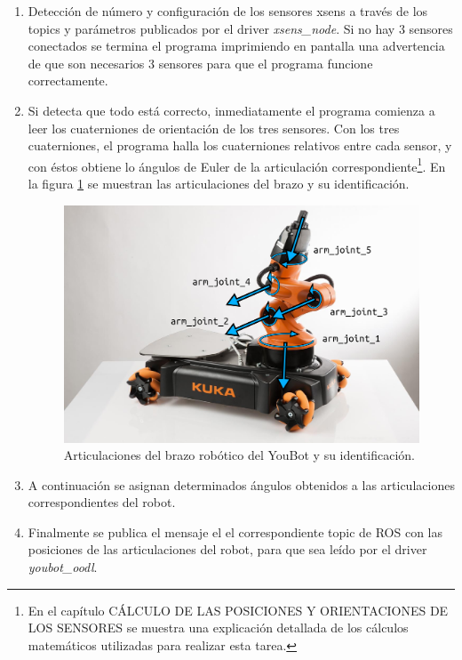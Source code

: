 \documentclass[12pt, a4paper]{report}
\begin{document}
\begin{enumerate}

\item Detección de número y configuración de los sensores xsens a través de los topics y parámetros publicados por el driver \textit{xsens\_node}. Si no hay 3 sensores conectados se termina el programa imprimiendo en pantalla una advertencia de que son necesarios 3 sensores para que el programa funcione correctamente.

\item Si detecta que todo está correcto, inmediatamente el programa comienza a leer los cuaterniones de orientación de los tres sensores. Con los tres cuaterniones, el programa halla los cuaterniones relativos entre cada sensor, y con éstos obtiene lo ángulos de Euler de la articulación correspondiente\footnote{En el capítulo CÁLCULO DE LAS POSICIONES Y ORIENTACIONES DE LOS SENSORES se muestra una explicación detallada de los cálculos matemáticos utilizadas para realizar esta tarea.}. En la figura \ref{fig: youbot_joints} se muestran las articulaciones del brazo y su identificación. 

\begin{figure}[h]
	\centering
		\includegraphics[scale=0.3]{../img/youbot_joints.png} 
	\caption[Articulaciones del brazo robótico del YouBot y su identificación]{Articulaciones del brazo robótico del YouBot y su identificación.} 
	\label{fig: youbot_joints}
\end{figure}

\item A continuación se asignan determinados ángulos obtenidos a las articulaciones correspondientes del robot. 

\item Finalmente se publica el mensaje el el correspondiente topic de ROS con las posiciones de las articulaciones del robot, para que sea leído por el driver \textit{youbot\_oodl}.

\end{enumerate}
\end{document}
